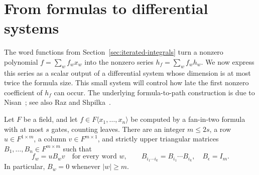 \section{From formulas to differential systems}
\label{sec:formula-systems}

The word functions from Section~\ref{sec:iterated-integrals} turn a nonzero
polynomial $f=\sum_w f_wx_w$ into the nonzero series
$h_f=\sum_w f_wh_w$.  We now express this series as a scalar output of a
differential system whose dimension is at most twice the formula size.
This small system will control how late the first nonzero coefficient of
$h_f$ can occur. The underlying formula-to-path construction is due to
Nisan~\cite[Section~2, Lemma~1]{Nisan1991}; see also Raz and
Shpilka~\cite[Section~2.1, Lemma~2, Step~1]{RazShpilka2005}.

\begin{lemma}
\label{lem:formula-representation}
Let $F$ be a field, and let $f\in F\langle x_1,\ldots,x_n\rangle$
be computed by a fan-in-two formula with at most $s$ gates, counting
leaves.  There are an integer $m\le 2s$, a row
$u\in F^{1\times m}$, a column $v\in F^{m\times1}$, and strictly
upper triangular matrices $B_1,\ldots,B_n\in F^{m\times m}$ such that
\begin{equation}
\label{eq:formula-representation}
 f_w=uB_wv\quad\text{for every word }w,
 \qquad
 B_{i_1\cdots i_k}=B_{i_1}\cdots B_{i_k},\quad B_\epsilon=I_m.
\end{equation}
In particular, $B_w=0$ whenever $|w|\ge m$.
\end{lemma}

